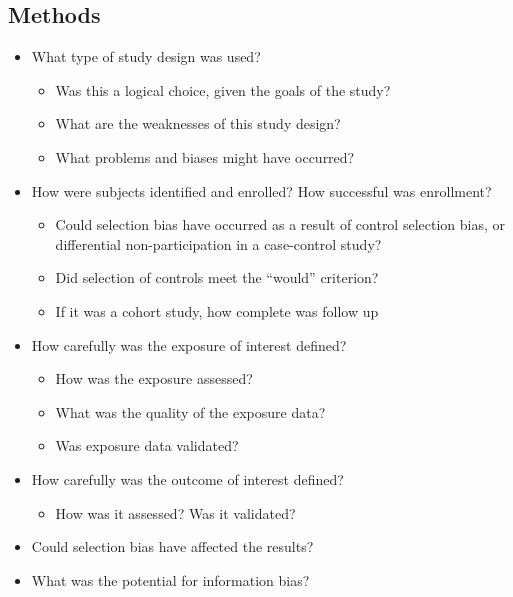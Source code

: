 \documentclass[]{book}
\providecommand{\tightlist}{%
  \setlength{\itemsep}{0pt}\setlength{\parskip}{0pt}}
\begin{document}
\hypertarget{methods}{%
\subsection{Methods}\label{methods}}

\begin{itemize}
\tightlist
\item
  What type of study design was used?

  \begin{itemize}
  \tightlist
  \item
    Was this a logical choice, given the goals of the study?
  \item
    What are the weaknesses of this study design?
  \item
    What problems and biases might have occurred?
  \end{itemize}
\item
  How were subjects identified and enrolled? How successful was enrollment?

  \begin{itemize}
  \tightlist
  \item
    Could selection bias have occurred as a result of control selection bias, or differential non-participation in a case-control study?
  \item
    Did selection of controls meet the ``would'' criterion?
  \item
    If it was a cohort study, how complete was follow up
  \end{itemize}
\item
  How carefully was the exposure of interest defined?

  \begin{itemize}
  \tightlist
  \item
    How was the exposure assessed?
  \item
    What was the quality of the exposure data?
  \item
    Was exposure data validated?
  \end{itemize}
\item
  How carefully was the outcome of interest defined?

  \begin{itemize}
  \tightlist
  \item
    How was it assessed? Was it validated?
  \end{itemize}
\item
  Could selection bias have affected the results?
\item
  What was the potential for information bias?


\end{itemize}
\end{document}
